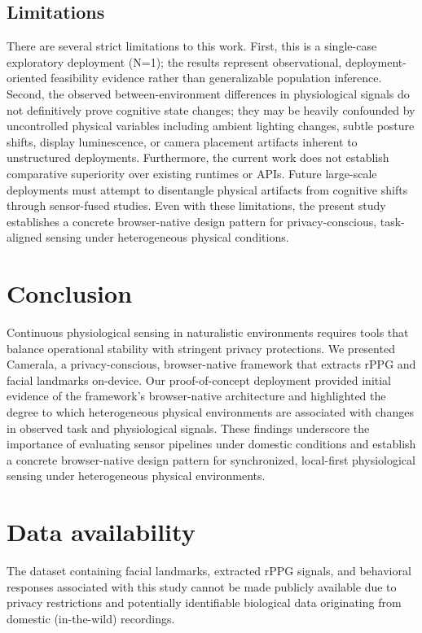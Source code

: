 \documentclass[final,3p,times,twocolumn]{elsarticle}
\begin{document}
\subsection{Limitations}
There are several strict limitations to this work. First, this is a single-case exploratory deployment (N=1); the results represent observational, deployment-oriented feasibility evidence rather than generalizable population inference. Second, the observed between-environment differences in physiological signals do not definitively prove cognitive state changes; they may be heavily confounded by uncontrolled physical variables including ambient lighting changes, subtle posture shifts, display luminescence, or camera placement artifacts inherent to unstructured deployments. Furthermore, the current work does not establish comparative superiority over existing runtimes or APIs. Future large-scale deployments must attempt to disentangle physical artifacts from cognitive shifts through sensor-fused studies. Even with these limitations, the present study establishes a concrete browser-native design pattern for privacy-conscious, task-aligned sensing under heterogeneous physical conditions.

\section{Conclusion}
Continuous physiological sensing in naturalistic environments requires tools that balance operational stability with stringent privacy protections. We presented Camerala, a privacy-conscious, browser-native framework that extracts rPPG and facial landmarks on-device. Our proof-of-concept deployment provided initial evidence of the framework's browser-native architecture and highlighted the degree to which heterogeneous physical environments are associated with changes in observed task and physiological signals. These findings underscore the importance of evaluating sensor pipelines under domestic conditions and establish a concrete browser-native design pattern for synchronized, local-first physiological sensing under heterogeneous physical environments.

\section*{Data availability}
The dataset containing facial landmarks, extracted rPPG signals, and behavioral responses associated with this study cannot be made publicly available due to privacy restrictions and potentially identifiable biological data originating from domestic (in-the-wild) recordings.
\end{document}
